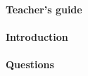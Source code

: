 \documentclass[../main]{subfiles}
\begin{document}
\paragraph{Teacher's guide}

\paragraph{Introduction}

\paragraph{Questions}
\begin{enumerate}
  \foreachproblem{\item\thisproblem}
\end{enumerate}
\end{document}
